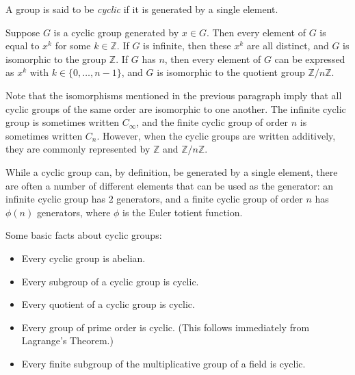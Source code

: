 \documentclass[12pt]{article}
\def\Z{\mathbb{Z}}
\begin{document}

A group is said to be \emph{cyclic} if it is generated by a single element.

Suppose $G$ is a cyclic group generated by $x\in G$.
Then every element of $G$ is equal to $x^k$ for some $k\in \Z$.
If $G$ is infinite, then these $x^k$ are all distinct,
and $G$ is isomorphic to the group $\Z$.
If $G$ has  $n$,
then every element of $G$ can be expressed as $x^k$ with $k\in\{0,\dots,n-1\}$,
and $G$ is isomorphic to the quotient group $\Z/n\Z$.

Note that the isomorphisms mentioned in the previous paragraph
imply that all cyclic groups of the same order are isomorphic to one another.
The infinite cyclic group is sometimes written $C_\infty$,
and the finite cyclic group of order $n$ is sometimes written $C_n$.
However, when the cyclic groups are written additively,
they are commonly represented by $\Z$ and $\Z/n\Z$.

While a cyclic group can, by definition, be generated by a single element,
there are often a number of different elements that can be used as the generator: an infinite cyclic group has $2$ generators,
and a finite cyclic group of order $n$ has $\phi(n)$ generators,
where $\phi$ is the Euler totient function.

Some basic facts about cyclic groups:
\begin{itemize}
\item Every cyclic group is abelian.
\item Every subgroup of a cyclic group is cyclic.
\item Every quotient of a cyclic group is cyclic.
\item Every group of prime order is cyclic. (This follows immediately from Lagrange's Theorem.)
\item Every finite subgroup of the multiplicative group of a field is cyclic.
\end{itemize}
\end{document}
